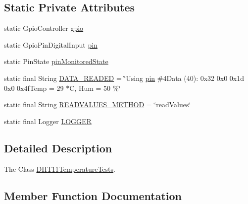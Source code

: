 \subsection*{Static Private Attributes}
\begin{DoxyCompactItemize}
\item 
static Gpio\+Controller \hyperlink{classcom_1_1libsensorj_1_1concretesensor_1_1test_1_1DHT11HumidityTests_a3631933a16a10839ab88bc36bc068126}{gpio}
\item 
static Gpio\+Pin\+Digital\+Input \hyperlink{classcom_1_1libsensorj_1_1concretesensor_1_1test_1_1DHT11HumidityTests_a9c5ef0f8073d54cec2b80c9b54aef2d1}{pin}
\item 
static Pin\+State \hyperlink{classcom_1_1libsensorj_1_1concretesensor_1_1test_1_1DHT11HumidityTests_aa4907b3b4ddbc118b0bb5a8571d17202}{pin\+Monitored\+State}
\item 
static final String \hyperlink{classcom_1_1libsensorj_1_1concretesensor_1_1test_1_1DHT11HumidityTests_a17f48d78c744c6773af54f613a7c670e}{D\+A\+T\+A\+\_\+\+R\+E\+A\+D\+E\+D} = \char`\"{}Using \hyperlink{classcom_1_1libsensorj_1_1concretesensor_1_1test_1_1DHT11HumidityTests_a9c5ef0f8073d54cec2b80c9b54aef2d1}{pin} \#4\+Data (40)\+: 0x32 0x0 0x1d 0x0 0x4f\+Temp = 29 $\ast$\+C, Hum = 50 \%\char`\"{}
\item 
static final String \hyperlink{classcom_1_1libsensorj_1_1concretesensor_1_1test_1_1DHT11HumidityTests_a990e9ce8e27fda4153926133ef67cb4f}{R\+E\+A\+D\+V\+A\+L\+U\+E\+S\+\_\+\+M\+E\+T\+H\+O\+D} = \char`\"{}read\+Values\char`\"{}
\item 
static final Logger \hyperlink{classcom_1_1libsensorj_1_1concretesensor_1_1test_1_1DHT11HumidityTests_a6423bd32a25b5e850b3b36abdc9bc31a}{L\+O\+G\+G\+E\+R}
\end{DoxyCompactItemize}


\subsection{Detailed Description}
The Class \hyperlink{classcom_1_1libsensorj_1_1concretesensor_1_1test_1_1DHT11TemperatureTests}{D\+H\+T11\+Temperature\+Tests}. 

\subsection{Member Function Documentation}
\hypertarget{classcom_1_1libsensorj_1_1concretesensor_1_1test_1_1DHT11HumidityTests_aef0e68198d00aff7b82f1e71cf91f12d}{}

